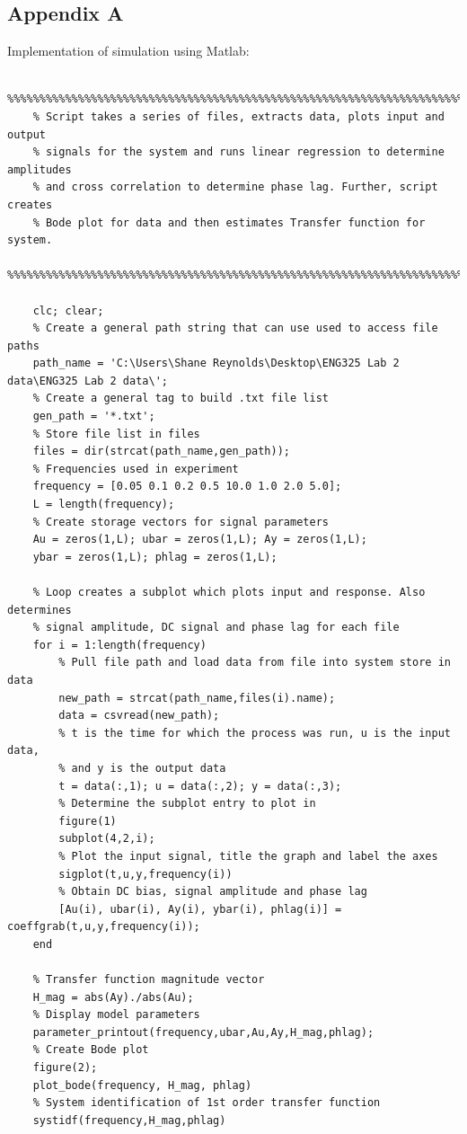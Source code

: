 \documentclass{article}
\begin{document}
\subsection{Appendix A}
Implementation of simulation using Matlab:
\begin{lstlisting}
	%%%%%%%%%%%%%%%%%%%%%%%%%%%%%%%%%%%%%%%%%%%%%%%%%%%%%%%%%%%%%%%%%%%%%%%%%%%%%
	% Script takes a series of files, extracts data, plots input and output
	% signals for the system and runs linear regression to determine amplitudes
	% and cross correlation to determine phase lag. Further, script creates
	% Bode plot for data and then estimates Transfer function for system.
	%%%%%%%%%%%%%%%%%%%%%%%%%%%%%%%%%%%%%%%%%%%%%%%%%%%%%%%%%%%%%%%%%%%%%%%%%%%%%
	
	clc; clear;
	% Create a general path string that can use used to access file paths
	path_name = 'C:\Users\Shane Reynolds\Desktop\ENG325 Lab 2 data\ENG325 Lab 2 data\';	
	% Create a general tag to build .txt file list
	gen_path = '*.txt';
	% Store file list in files
	files = dir(strcat(path_name,gen_path));
	% Frequencies used in experiment
	frequency = [0.05 0.1 0.2 0.5 10.0 1.0 2.0 5.0];
	L = length(frequency);
	% Create storage vectors for signal parameters
	Au = zeros(1,L); ubar = zeros(1,L); Ay = zeros(1,L);
	ybar = zeros(1,L); phlag = zeros(1,L);
	
	% Loop creates a subplot which plots input and response. Also determines
	% signal amplitude, DC signal and phase lag for each file
	for i = 1:length(frequency)
		% Pull file path and load data from file into system store in data
		new_path = strcat(path_name,files(i).name);
		data = csvread(new_path);
		% t is the time for which the process was run, u is the input data,
		% and y is the output data
		t = data(:,1); u = data(:,2); y = data(:,3);
		% Determine the subplot entry to plot in
		figure(1)
		subplot(4,2,i);
		% Plot the input signal, title the graph and label the axes
		sigplot(t,u,y,frequency(i))
		% Obtain DC bias, signal amplitude and phase lag
		[Au(i), ubar(i), Ay(i), ybar(i), phlag(i)] = coeffgrab(t,u,y,frequency(i));
	end
	
	% Transfer function magnitude vector
	H_mag = abs(Ay)./abs(Au);
	% Display model parameters
	parameter_printout(frequency,ubar,Au,Ay,H_mag,phlag);
	% Create Bode plot
	figure(2);
	plot_bode(frequency, H_mag, phlag)
	% System identification of 1st order transfer function
	systidf(frequency,H_mag,phlag)
	
\end{lstlisting}
\end{document}
